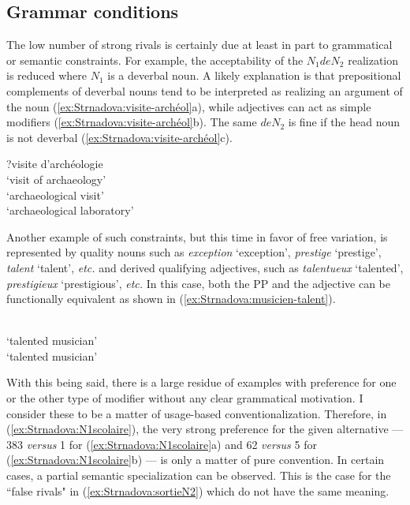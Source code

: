 \documentclass[output=paper]{LSP/langsci}
\begin{document}

\subsection{Grammar conditions}

The low number of strong rivals is certainly due at least in part to grammatical or semantic constraints. For example, the acceptability of the $N_1deN_2$ realization is reduced where $N_1$ is a deverbal noun. A likely explanation is that prepositional complements of deverbal nouns tend to be interpreted as realizing an argument of the noun (\ref{ex:Strnadova:visite-archéol}a), while adjectives can act as simple modifiers (\ref{ex:Strnadova:visite-archéol}b). The same $deN_2$ is fine if the head noun is not deverbal  (\ref{ex:Strnadova:visite-archéol}c).

\begin{exe}
\ex \begin{xlist} \label{ex:Strnadova:visite-archéol}
\ex ?{visite d'archéologie}\\ `visit of archaeology'
\\ `archaeological visit'
\\ `archaeological laboratory'
\end{xlist}
\end{exe}

Another example of such constraints, but this time in favor of free variation, is represented by quality nouns such as \emph{exception} `exception', \emph{prestige} `prestige', \emph{talent} `talent', \emph{etc.} and derived qualifying adjectives, such as \emph{talentueux} `talented', \emph{prestigieux} `prestigious', \emph{etc.} In this case, both the PP and the adjective can be functionally equivalent as shown in (\ref{ex:Strnadova:musicien-talent}).

\begin{exe}
\ex \begin{xlist} \label{ex:Strnadova:musicien-talent}
\\ `talented musician'
\\ `talented musician'
\end{xlist}
\end{exe}

With this being said, there is a large residue of examples with preference for one or the other type of modifier without any clear grammatical motivation. I consider these to be a matter of usage-based conventionalization. Therefore, in (\ref{ex:Strnadova:N1scolaire}),  the very strong preference for the given alternative — 383 \emph{versus} 1 for (\ref{ex:Strnadova:N1scolaire}a) and 62 \emph{versus} 5 for (\ref{ex:Strnadova:N1scolaire}b) — is only a matter of pure convention. In certain cases, a partial semantic specialization can be observed. This is the case for the ``false rivals" in (\ref{ex:Strnadova:sortieN2}) which do not have the same meaning.
\end{document}
